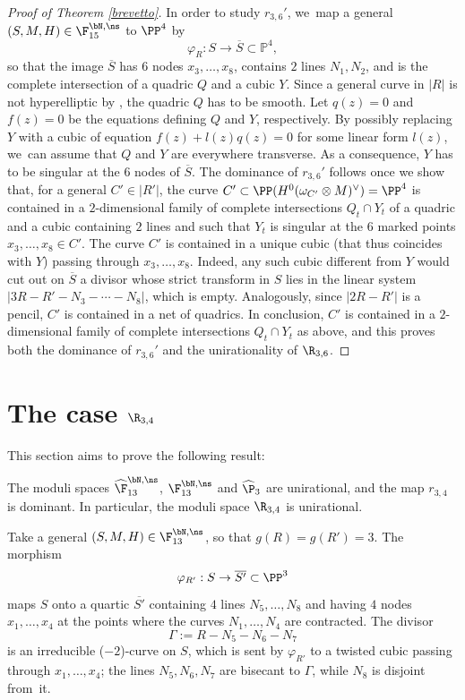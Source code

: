 \begin{proof}[Proof of Theorem \ref{brevetto}]
In order to study $r_{3,6}'$, we~map a general $(S,M,H)\in \F_{15}^{\bN,\ns}$ to $\PP^4$ by
\[
\varphi_{R}:S\to \overline{S}\subset \mathbb P^4,
\]
so that the image $\overline{S}$ has $6$ nodes $x_3,\ldots, x_8$, contains $2$ lines $N_1,N_2$, and is the complete intersection of a quadric $Q$ and a cubic $Y$. Since a general curve in $|R|$ is not hyperelliptic by \cite[Prop.\,5.6]{DL}, the quadric $Q$ has to be smooth. Let $q(z)=0$ and $f(z)=0$ be the equations defining $Q$ and $Y$, respectively. By possibly replacing $Y$ with a cubic of equation $f(z)+l(z)q(z)=0$ for some linear form $l(z)$, we~can assume that $Q$ and $Y$ are everywhere transverse. As a consequence, $Y$ has to be singular at the $6$ nodes of $\overline{S}$. The dominance of $r_{3,6}'$ follows once we show that, for a general $C'\in |R'|$, the curve $C'\subset \PP(H^0(\omega_{C'}\otimes M)^\vee)=\PP^4$ is contained in a $2$-dimensional family of complete intersections $Q_t\cap Y_t$ of a quadric and a cubic containing $2$ lines and such that $Y_t$ is singular at the $6$ marked points $x_3,\ldots,x_8\in C'$. The curve $C'$ is contained in a unique cubic (that thus coincides with $Y$) passing through $x_3,\ldots, x_8$. Indeed, any such cubic different from $Y$ would cut out on $\overline{S}$ a divisor whose strict transform in $S$ lies in the linear system $|3R-R'-N_3-\cdots-N_8|$, which is empty. Analogously, since
$|2R-R'|$ is a pencil, $C'$ is contained in a net of quadrics. In conclusion, $C'$ is contained in a $2$-dimensional family of complete intersections $Q_t\cap Y_t$ as above, and this proves both the dominance of $r_{3,6}'$ and the unirationality of $\R_{3,6}$.\Changelback
\end{proof}

\section{The case \texorpdfstring{$\R_{3,4}$}{R}}

This section aims to prove the following result:

\begin{thm}\label{ale}
The moduli spaces $\widehat{\F}_{13}^{\bN,\ns}$, $\F_{13}^{\bN,\ns}$ and $\widehat\P_{3}$ are unirational, and the map $r_{3,4}$ is dominant. In particular, the moduli space $\R_{3,4}$ is unirational.
\end{thm}
Take a general $(S,M,H)\in \F_{13}^{\bN,\ns}$, so that $g(R)=g(R')=3$. The morphism
\[
\varphi_{R'}:S\to \overline{S'}\subset\PP^3
\]
maps $S$ onto a quartic $\overline{S'}$ containing $4$ lines $N_5,\ldots,N_8$ and having $4$ nodes $x_1,\ldots,x_4$ at the points where the curves $N_1,\ldots,N_4$ are contracted. The divisor
\[
\Gamma:=R-N_5-N_6-N_7
\]
is an irreducible ($-2$)-curve on $S$, which is sent by $\varphi_{R'}$ to a twisted cubic passing through $x_1,\ldots,x_4$; the lines $N_5,N_6,N_7$
are bisecant to $\Gamma$, while $N_8$ is disjoint from~it.

